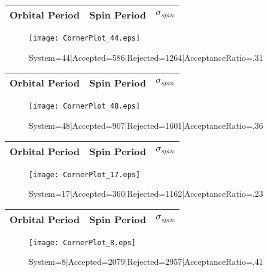 \documentclass[10pt]{article}
\begin{document}
\begin{center}
        \begin{tabular}{|c|c|c|}
        \hline
Orbital Period & Spin Period & $\sigma_{spin}$ \\
 \hline
        \end{tabular}
        \end{center}
\begin{figure}[h] 
        \texttt{[image: CornerPlot\_44.eps]}
        \caption{System=44|Accepted=586|Rejected=1264|AcceptanceRatio=.31}
        \label{S44}
        \centering
        \end{figure}
\begin{center}
        \begin{tabular}{|c|c|c|}
        \hline
Orbital Period & Spin Period & $\sigma_{spin}$ \\
 \hline
        \end{tabular}
        \end{center}
\begin{figure}[h] 
        \texttt{[image: CornerPlot\_48.eps]}
        \caption{System=48|Accepted=907|Rejected=1601|AcceptanceRatio=.36}
        \label{S48}
        \centering
        \end{figure}
\begin{center}
        \begin{tabular}{|c|c|c|}
        \hline
Orbital Period & Spin Period & $\sigma_{spin}$ \\
 \hline
        \end{tabular}
        \end{center}
\begin{figure}[h] 
        \texttt{[image: CornerPlot\_17.eps]}
        \caption{System=17|Accepted=360|Rejected=1162|AcceptanceRatio=.23}
        \label{S17}
        \centering
        \end{figure}
\begin{center}
        \begin{tabular}{|c|c|c|}
        \hline
Orbital Period & Spin Period & $\sigma_{spin}$ \\
 \hline
        \end{tabular}
        \end{center}
\begin{figure}[h] 
        \texttt{[image: CornerPlot\_8.eps]}
        \caption{System=8|Accepted=2079|Rejected=2957|AcceptanceRatio=.41}
        \label{S8}
        \centering
        \end{figure}
\end{document}
